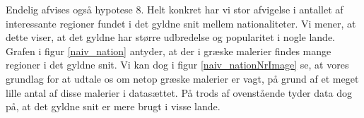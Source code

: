 {Endelig afvises også hypotese 8. Helt konkret har vi stor afvigelse i
antallet af interessante regioner fundet i det gyldne snit mellem
nationaliteter. Vi mener, at dette viser, at det gyldne har større
udbredelse og popularitet i nogle lande. Grafen i figur
\ref{naiv_nation} antyder, at der i græske malerier findes mange regioner
i det gyldne snit. Vi kan dog i figur \ref{naiv_nationNrImage} se, at
vores grundlag for at udtale os om netop græske malerier er vagt, på
grund af et meget lille antal af disse malerier i datasættet. På trods
af ovenstående tyder data dog på, at det gyldne snit er mere brugt i
visse lande.

}

